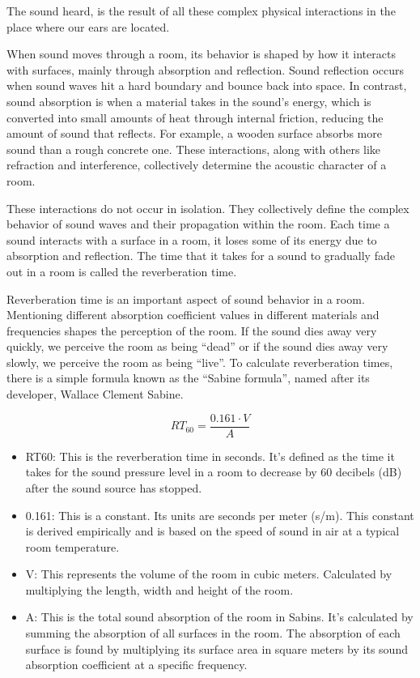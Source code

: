            The sound heard, is the result of all these complex physical interactions in the place where our ears are located.\par

            When sound moves through a room, its behavior is shaped by how it interacts with surfaces, mainly through absorption and reflection. Sound reflection occurs when sound waves hit a hard boundary and bounce back into space. In contrast, sound absorption is when a material takes in the sound's energy, which is converted into small amounts of heat through internal friction, reducing the amount of sound that reflects\cite{Acoustics_and_Psychophysics}. For example, a wooden surface absorbs more sound than a rough concrete one. These interactions, along with others like refraction and interference, collectively determine the acoustic character of a room.\par

            These interactions do not occur in isolation. They collectively define the complex behavior of sound waves and their propagation within the room. Each time a sound interacts with a surface in a room, it loses some of its energy due to absorption and reflection. The time that it takes for a sound to gradually fade out in a room is called the reverberation time.\par

            Reverberation time is an important aspect of sound behavior in a room. Mentioning different absorption coefficient values in different materials and frequencies shapes the perception of the room. If the sound dies away very quickly, we perceive the room as being “dead” or if the sound dies away very slowly, we perceive the room as being “live”. To calculate reverberation times, there is a simple formula known as the “Sabine formula”, named after its developer, Wallace Clement Sabine\cite{Acoustics_and_Psychophysics}.\par 
            $$RT_{60} = \frac{0.161 \cdot V}{A}$$
            \begin{itemize}
                \item RT60: This is the reverberation time in seconds. It's defined as the time it takes for the sound pressure level in a room to decrease by 60 decibels (dB) after the sound source has stopped\cite{Room_Acoustics}.
                \item 0.161: This is a constant. Its units are seconds per meter (s/m). This constant is derived empirically and is based on the speed of sound in air at a typical room temperature.
                \item V: This represents the volume of the room in cubic meters. Calculated by multiplying the length, width and height of the room.
                \item A: This is the total sound absorption of the room in Sabins. It's calculated by summing the absorption of all surfaces in the room. The absorption of each surface is found by multiplying its surface area in square meters by its sound absorption coefficient at a specific frequency.
            \end{itemize}

